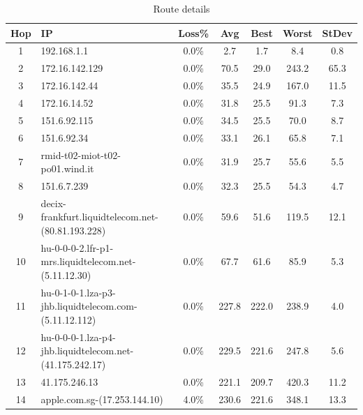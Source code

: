 \documentclass[a4paper,10pt]{article}
\begin{document}
        \begin{table}[H]
                \centering
                \caption{\small Route details}
                \vspace{0.3cm}
                \begin{tabular}{|c|l|c|c|c|c|c|}
                \hline
                    \textbf{Hop} & \textbf{IP} & \textbf{Loss\%} & \textbf{Avg} & \textbf{Best} & \textbf{Worst} & \textbf{StDev} \\ \hline
                    1 & 192.168.1.1 & 0.0\% & 2.7 & 1.7 & 8.4 & 0.8 \\ \hline
                    2 & 172.16.142.129 & 0.0\% & 70.5 & 29.0 & 243.2 & 65.3 \\ \hline
                    3 & 172.16.142.44 & 0.0\% & 35.5 & 24.9 & 167.0 & 11.5 \\ \hline
                    4 & 172.16.14.52 & 0.0\% & 31.8 & 25.5 & 91.3 & 7.3 \\ \hline
                    5 & 151.6.92.115 & 0.0\% & 34.5 & 25.5 & 70.0 & 8.7 \\ \hline
                    6 & 151.6.92.34 & 0.0\% & 33.1 & 26.1 & 65.8 & 7.1 \\ \hline
                    7 & rmid-t02-miot-t02-po01.wind.it & 0.0\% & 31.9 & 25.7 & 55.6 & 5.5 \\ \hline
                    8 & 151.6.7.239 & 0.0\% & 32.3 & 25.5 & 54.3 & 4.7 \\ \hline
                    9 & decix-frankfurt.liquidtelecom.net-(80.81.193.228) & 0.0\% & 59.6 & 51.6 & 119.5 & 12.1 \\ \hline
                    10 & hu-0-0-0-2.lfr-p1-mrs.liquidtelecom.net-(5.11.12.30) & 0.0\% & 67.7 & 61.6 & 85.9 & 5.3 \\ \hline
                    11 & hu-0-1-0-1.lza-p3-jhb.liquidtelecom.com-(5.11.12.112) & 0.0\% & 227.8 & 222.0 & 238.9 & 4.0 \\ \hline
                    12 & hu-0-0-0-1.lza-p4-jhb.liquidtelecom.net-(41.175.242.17) & 0.0\% & 229.5 & 221.6 & 247.8 & 5.6 \\ \hline
                    13 & 41.175.246.13 & 0.0\% & 221.1 & 209.7 & 420.3 & 11.2 \\ \hline
                    14 & apple.com.sg-(17.253.144.10) & 4.0\% & 230.6 & 221.6 & 348.1 & 13.3 \\ \hline
                \end{tabular}
                \label{tab:BS_path}
            \end{table}
\newpage
\end{document}
